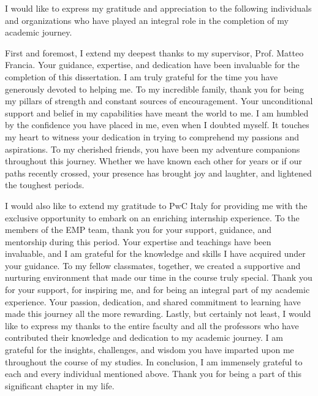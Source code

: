 \documentclass[12pt,a4paper,openright,twoside]{book}
\begin{document}
	
\frontmatter



\begin{acknowledgements}

I would like to express my gratitude and appreciation to the following individuals and organizations who have played an integral role in the completion of my academic journey. 

First and foremost, I extend my deepest thanks to my supervisor, Prof. Matteo Francia. 
%
Your guidance, expertise, and dedication have been invaluable for the completion of this dissertation. 
%
I am truly grateful for the time you have generously devoted to helping me.
%
To my incredible family, thank you for being my pillars of strength and constant sources of encouragement. 
%
Your unconditional support and belief in my capabilities have meant the world to me. 
%
I am humbled by the confidence you have placed in me, even when I doubted myself. 
%
It touches my heart to witness your dedication in trying to comprehend my passions and aspirations. 
%
To my cherished friends, you have been my adventure companions throughout this journey. 
%
Whether we have known each other for years or if our paths recently crossed, your presence has brought joy and laughter, and lightened the toughest periods. 

I would also like to extend my gratitude to PwC Italy for providing me with the exclusive opportunity to embark on an enriching internship experience. 
%
To the members of the EMP team, thank you for your support, guidance, and mentorship during this period. 
%
Your expertise and teachings have been invaluable, and I am grateful for the knowledge and skills I have acquired under your guidance.
%
To my fellow classmates, together, we created a supportive and nurturing environment that made our time in the course truly special. 
%
Thank you for your support, for inspiring me, and for being an integral part of my academic experience. 
%
Your passion, dedication, and shared commitment to learning have made this journey all the more rewarding.
%
Lastly, but certainly not least, I would like to express my thanks to the entire faculty and all the professors who have contributed their knowledge and dedication to my academic journey.
%
I am grateful for the insights, challenges, and wisdom you have imparted upon me throughout the course of my studies.
%
In conclusion, I am immensely grateful to each and every individual mentioned above.
%
Thank you for being a part of this significant chapter in my life.

\end{acknowledgements}
\end{document}
